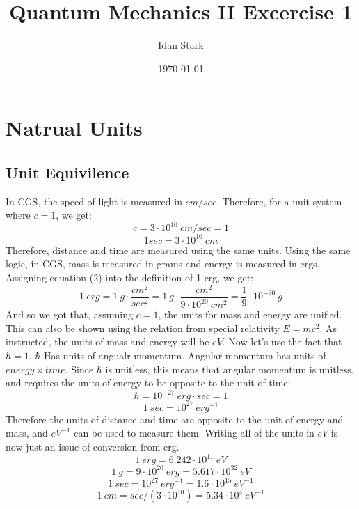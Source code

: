 \documentclass{article}
\title{Quantum Mechanics II Excercise 1}
\author{Idan Stark}
\date{\today}
\begin{document}
\maketitle
\section{Natrual Units}
\label{sec:ex1}
\subsection{Unit Equivilence}
In CGS, the speed of light is measured in $cm/sec$. Therefore, for a unit system where $c = 1$, we get:
\begin{equation}
    c = 3\cdot10^{10}\:cm / sec = 1
\end{equation}
\begin{equation}
    1 sec = 3\cdot10^{10}\:cm
\end{equation}
Therefore, distance and time are measured using the same units. Using the same logic, in CGS, mass is measured in grams and energy is measured in ergs. Assigning equation (2) into the definition of 1 erg, we get:
\begin{equation}
    1\:erg = 1\:g\cdot\frac{cm^2}{sec^2} = 1\:g\cdot\frac{cm^2}{9\cdot10^{20}\:cm^2} = \frac{1}{9}\cdot10^{-20}\:g
\end{equation}
And so we got that, assuming $c = 1$, the units for mass and energy are unified. This can also be shown using the relation from special relativity $E = mc^2$. As instructed, the units of mass and energy will be $eV$.
\newline
Now let's use the fact that $\hbar = 1$. $\hbar$ Has units of angualr momentum. Angular momentum has units of $energy \times time$. Since $\hbar$ is unitless, this means that angular momentum is unitless, and requires the units of energy to be opposite to the unit of time:
\begin{equation}
    \hbar = 10^{-27}\:erg\cdot sec = 1
\end{equation}
\begin{equation}
    1\:sec = 10^{27}\:erg^{-1}
\end{equation}
Therefore the units of distance and time are opposite to the unit of energy and mass, and $eV^{-1}$ can be used to measure them. Writing all of the units in ${eV}$ is now just an issue of conversion from erg. 
\begin{equation}
    1\:erg = 6.242\cdot10^{11}\:eV
\end{equation}
\begin{equation}
    1\:g = 9\cdot10^{20}\:erg = 5.617\cdot10^{32}\:eV
\end{equation}
\begin{equation}
    1\:sec = 10^{27}\:erg^{-1} = 1.6\cdot10^{15}\:eV^{-1}
\end{equation}
\begin{equation}
    1\:cm = sec/(3\cdot10^{10}) = 5.34\cdot10^{4}\:eV^{-1}
\end{equation}
\end{document}

